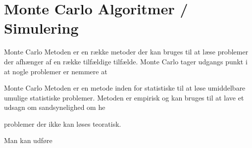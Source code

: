 \documentclass[../../SRP.tex]{subfiles}
\begin{document}
\chapter{Monte Carlo Algoritmer / Simulering}

Monte Carlo Metoden er en række metoder der kan bruges til at læse problemer der afhænger af en række tilfældige tilfælde. Monte Carlo tager udgangs punkt i at nogle problemer er nemmere at  

Monte Carlo Metoden er en metode inden for statistiske til at løse umiddelbare umulige statistiske problemer. Metoden er empirisk og kan bruges til at lave et udsagn om sandsynelighed om he 

problemer der ikke kan løses teoratisk.

Man kan udføre
\end{document}
